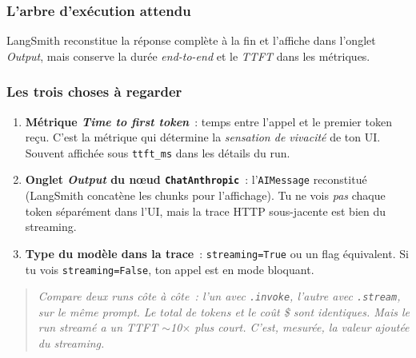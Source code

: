 \documentclass[11pt,a4paper]{article}
\begin{document}
\subsubsection*{L'arbre d'exécution attendu}

\begin{center}
\end{center}

LangSmith reconstitue la réponse complète à la fin et l'affiche dans
l'onglet \emph{Output}, mais conserve la durée \emph{end-to-end} et le
\emph{TTFT} dans les métriques.

\subsubsection*{Les trois choses à regarder}

\begin{enumerate}[leftmargin=*]
  \item \textbf{Métrique \emph{Time to first token}}~: temps entre l'appel
        et le premier token reçu. C'est la métrique qui détermine la
        \emph{sensation de vivacité} de ton UI. Souvent affichée sous
        \texttt{ttft\_ms} dans les détails du run.
  \item \textbf{Onglet \emph{Output} du nœud \texttt{ChatAnthropic}}~:
        l'\texttt{AIMessage} reconstitué (LangSmith concatène les chunks
        pour l'affichage). Tu ne vois \emph{pas} chaque token séparément
        dans l'UI, mais la trace HTTP sous-jacente est bien du streaming.
  \item \textbf{Type du modèle dans la trace}~:
        \texttt{streaming=True} ou un flag équivalent. Si tu vois
        \texttt{streaming=False}, ton appel est en mode bloquant.
\end{enumerate}

\begin{quote}\itshape
Compare deux runs côte à côte~: l'un avec \texttt{.invoke}, l'autre avec
\texttt{.stream}, sur le même prompt. Le total de tokens et le coût \$
sont identiques. Mais le run streamé a un TTFT $\sim$10$\times$ plus
court. C'est, mesurée, la valeur ajoutée du streaming.
\end{quote}
\end{document}
